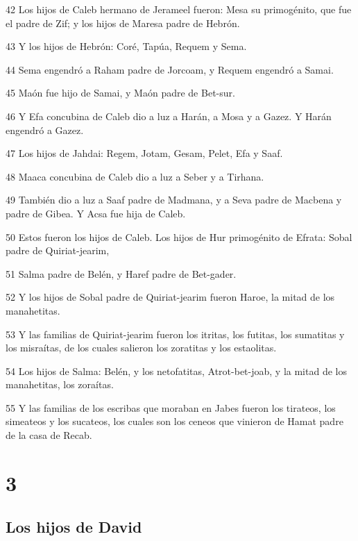 \par 42 Los hijos de Caleb hermano de Jerameel fueron: Mesa su primogénito, que fue el padre de Zif; y los hijos de Maresa padre de Hebrón.
\par 43 Y los hijos de Hebrón: Coré, Tapúa, Requem y Sema.
\par 44 Sema engendró a Raham padre de Jorcoam, y Requem engendró a Samai.
\par 45 Maón fue hijo de Samai, y Maón padre de Bet-sur.
\par 46 Y Efa concubina de Caleb dio a luz a Harán, a Mosa y a Gazez. Y Harán engendró a Gazez.
\par 47 Los hijos de Jahdai: Regem, Jotam, Gesam, Pelet, Efa y Saaf.
\par 48 Maaca concubina de Caleb dio a luz a Seber y a Tirhana.
\par 49 También dio a luz a Saaf padre de Madmana, y a Seva padre de Macbena y padre de Gibea. Y Acsa fue hija de Caleb.
\par 50 Estos fueron los hijos de Caleb. Los hijos de Hur primogénito de Efrata: Sobal padre de Quiriat-jearim,
\par 51 Salma padre de Belén, y Haref padre de Bet-gader.
\par 52 Y los hijos de Sobal padre de Quiriat-jearim fueron Haroe, la mitad de los manahetitas.
\par 53 Y las familias de Quiriat-jearim fueron los itritas, los futitas, los sumatitas y los misraítas, de los cuales salieron los zoratitas y los estaolitas.
\par 54 Los hijos de Salma: Belén, y los netofatitas, Atrot-bet-joab, y la mitad de los manahetitas, los zoraítas.
\par 55 Y las familias de los escribas que moraban en Jabes fueron los tirateos, los simeateos y los sucateos, los cuales son los ceneos que vinieron de Hamat padre de la casa de Recab.

\chapter{3}

\section*{Los hijos de David}

